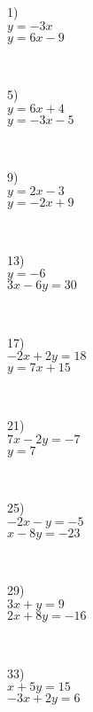 \begin{multicols}{4}
  1)\\ 
	$y = - 3 x$\\
	$y = 6 x - 9$\par
  ~\par
  5)\\ 
  $y = 6 x + 4$\\
	$y = - 3 x - 5$\par
  ~\par
  9)\\ 
  $y = 2 x - 3$\\
	$y = - 2 x + 9$\par
  ~\par
  13)\\ 
  $y = - 6$\\
	$3 x - 6 y = 30$\par
  ~\par
  17)\\ 
  $- 2 x + 2 y = 18$\\
  $y = 7 x + 15$\par
  ~\par
  21)\\ 
  $7 x - 2 y = - 7$\\
  $y = 7$\par
  ~\par
  25)\\ 
  $- 2 x - y = - 5$\\
  $x - 8 y = - 23$\par
  ~\par
  29)\\ 
  $3 x + y = 9$\\
	$2 x + 8 y = - 16$\par
  ~\par
  33)\\ 
  $x + 5 y = 15$\\
  $- 3 x + 2 y = 6$\par
  ~\par


\end{multicols}
